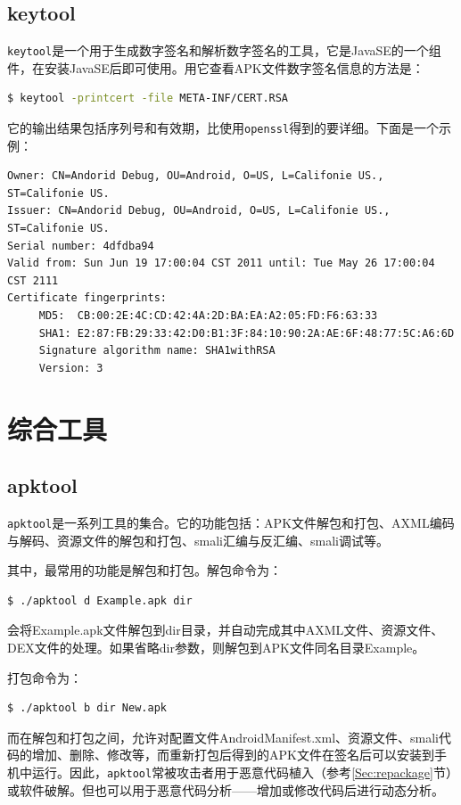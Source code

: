 \subsection{keytool}
\lstinline!keytool!是一个用于生成数字签名和解析数字签名的工具，它是JavaSE的一个组件，在安装JavaSE后即可使用。用它查看APK文件数字签名信息的方法是：
\begin{lstlisting}[language=bash, numbers=none]
 $ keytool -printcert -file META-INF/CERT.RSA
\end{lstlisting}
它的输出结果包括序列号和有效期，比使用\lstinline!openssl!得到的要详细。下面是一个示例：

\begin{lstlisting}[language={}, numbers=none]
Owner: CN=Andorid Debug, OU=Android, O=US, L=Califonie US., ST=Califonie US.
Issuer: CN=Andorid Debug, OU=Android, O=US, L=Califonie US., ST=Califonie US.
Serial number: 4dfdba94
Valid from: Sun Jun 19 17:00:04 CST 2011 until: Tue May 26 17:00:04 CST 2111
Certificate fingerprints:
	 MD5:  CB:00:2E:4C:CD:42:4A:2D:BA:EA:A2:05:FD:F6:63:33
	 SHA1: E2:87:FB:29:33:42:D0:B1:3F:84:10:90:2A:AE:6F:48:77:5C:A6:6D
	 Signature algorithm name: SHA1withRSA
	 Version: 3
\end{lstlisting}

\section{综合工具}
\subsection{apktool}
\lstinline!apktool!\cite{url:apktool}是一系列工具的集合。它的功能包括：APK文件解包和打包、AXML编码与解码、资源文件的解包和打包、smali汇编与反汇编、smali调试等。

其中，最常用的功能是解包和打包。解包命令为：
\begin{lstlisting}[language=bash, numbers=none]
 $ ./apktool d Example.apk dir
\end{lstlisting}
会将Example.apk文件解包到dir目录，并自动完成其中AXML文件、资源文件、DEX文件的处理。如果省略dir参数，则解包到APK文件同名目录Example。

打包命令为：
\begin{lstlisting}[language=bash, numbers=none]
 $ ./apktool b dir New.apk
\end{lstlisting}

而在解包和打包之间，允许对配置文件AndroidManifest.xml、资源文件、smali代码的增加、删除、修改等，而重新打包后得到的APK文件在签名后可以安装到手机中运行。因此，\lstinline!apktool!常被攻击者用于恶意代码植入（参考\ref{Sec:repackage}节）或软件破解。但也可以用于恶意代码分析——增加或修改代码后进行动态分析。

